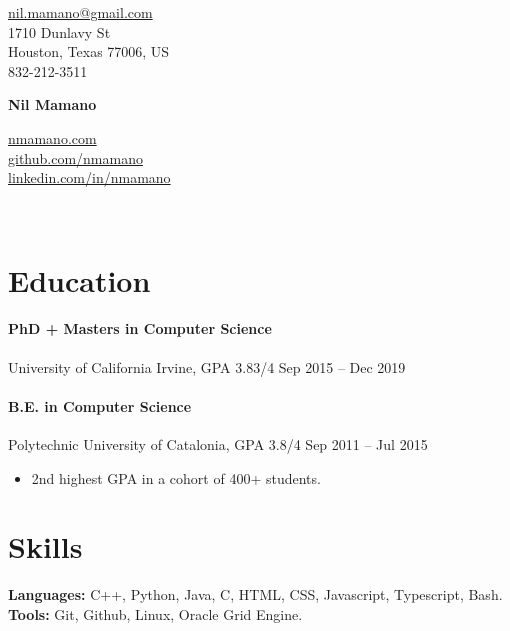 \documentclass[letterpaper,10pt,oneside]{article}
\begin{document}
{\raggedleft

\begin{minipage}[c]{0.28\textwidth}
	\begin{flushleft}
	\href{mailto:nil.mamano@gmail.com}{nil.mamano@gmail.com}\\
	1710 Dunlavy St\\
	Houston, Texas 77006, US\\
	832-212-3511
	\end{flushleft}
\end{minipage}\hfill
\begin{minipage}[c]{0.3\textwidth}
	\begin{center}
		\Huge{\textbf{Nil Mamano}}
	\end{center}
\end{minipage}\hfill
\begin{minipage}[c]{0.3\textwidth}
	\begin{flushright}
	\href{http://www.nmamano.com}{nmamano.com} \\
	\href{http://www.github.com/nmamano}{github.com/nmamano} \\
	\href{http://www.linkedin.com/in/nmamano}{linkedin.com/in/nmamano}
	\end{flushright}
\end{minipage}\\
\vspace{5px}
\hrulefill
}

\vspace{-2px}
\section*{Education}
\paragraph*{PhD + Masters in Computer Science} University of California Irvine, GPA 3.83/4 \hfill Sep 2015 -- Dec 2019
\paragraph*{B.E. in Computer Science} Polytechnic University of Catalonia, GPA 3.8/4 \hfill Sep 2011 -- Jul 2015
\vspace*{-1px}
\begin{itemize}[leftmargin=15px]
	\item 2nd highest GPA in a cohort of 400+ students.
\end{itemize}

\section*{Skills}
\textbf{Languages:} C++, Python, Java, C, HTML, CSS, Javascript, Typescript, Bash.~
\textbf{Tools:} Git, Github, Linux, Oracle Grid Engine.
\end{document}
